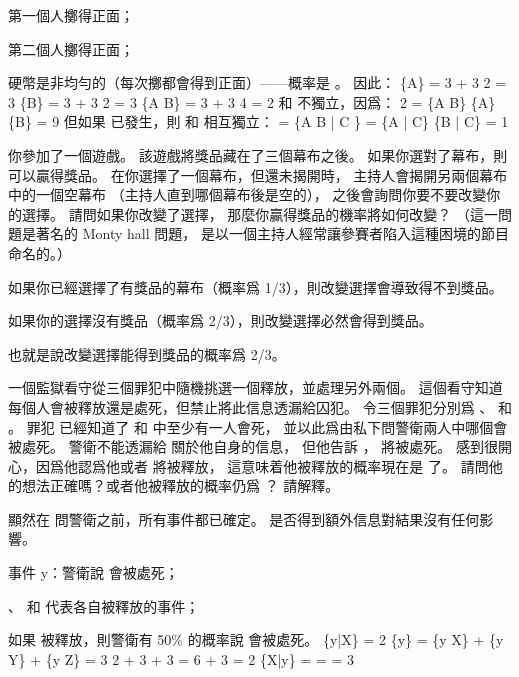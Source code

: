 \startANSWER
\startigBase[A]
\item 第一個人擲得正面；
\item 第二個人擲得正面；
\item 硬幣是非均勻的（每次擲都會得到正面）——概率是 。
\stopigBase
因此：
\startformula\startmathalignment[n=1]
\NC \Pr\{A\} =  3  +  3 \cdot {} 2 =  3 \NR
\NC \Pr\{B\} =  3  +  3 \cdot {} 2 =  3 \NR
\NC \Pr\{A \cap B\} =  3  +  3 \cdot {} 4 =  2 \NR
\stopmathalignment\stopformula
{} 和  不獨立，因爲：
\startformula
{} 2 = \Pr\{A \cap B\} \neq \Pr\{A\} \cdot \Pr\{B\} =  9
\stopformula
但如果  已發生，則  和  相互獨立：
 = \Pr\{A \cap B | C \} = \Pr\{A | C\} \cdot \Pr\{B | C\} = 1
\stopformula
\stopANSWER

\startEXERCISE\DIFFICULT
你參加了一個遊戲。
該遊戲將獎品藏在了三個幕布之後。
如果你選對了幕布，則可以贏得獎品。
在你選擇了一個幕布，但還未揭開時，
主持人會揭開另兩個幕布中的一個空幕布
（主持人直到哪個幕布後是空的），
之後會詢問你要不要改變你的選擇。
請問如果你改變了選擇，
那麼你贏得獎品的機率將如何改變？
（這一問題是著名的 {\EMP Monty hall 問題}，
是以一個主持人經常讓參賽者陷入這種困境的節目命名的。）
\stopEXERCISE

\startANSWER
如果你已經選擇了有獎品的幕布（概率爲 1/3），則改變選擇會導致得不到獎品。

如果你的選擇沒有獎品（概率爲 2/3），則改變選擇必然會得到獎品。

也就是說改變選擇能得到獎品的概率爲 2/3。

\stopANSWER

\startEXERCISE
一個監獄看守從三個罪犯中隨機挑選一個釋放，並處理另外兩個。
這個看守知道每個人會被釋放還是處死，但禁止將此信息透漏給囚犯。
令三個罪犯分別爲 、  和 。
罪犯  已經知道了  和  中至少有一人會死，
並以此爲由私下問警衛兩人中哪個會被處死。
警衛不能透漏給  關於他自身的信息，
但他告訴 ，  將被處死。
  感到很開心，因爲他認爲他或者  將被釋放，
這意味着他被釋放的概率現在是  了。
請問他的想法正確嗎？或者他被釋放的概率仍爲 ？
請解釋。
\stopEXERCISE

\startANSWER
顯然在  問警衛之前，所有事件都已確定。
  是否得到額外信息對結果沒有任何影響。

\startigBase[a]
\item 事件 y：警衛說  會被處死；
\item {}、  和  代表各自被釋放的事件；
\item 如果  被釋放，則警衛有 50\% 的概率說  會被處死。
\stopigBase
\startformula\startmathalignment[n=1]
\NC \Pr\{y|X\} =  2 \NR
\NC \Pr\{y\} = \Pr\{y \cap X\} + \Pr\{y \cap Y\} + \Pr\{y \cap Z\}
             =  3 \cdot {} 2 +  3  +  3 
             =  6 +  3
             =  2 \NR
\NC \Pr\{X|y\} = 
               = 
               =  3 \NR
\stopmathalignment\stopformula

\stopANSWER

\stopsection
